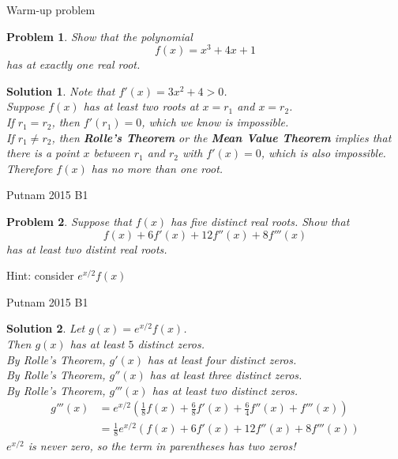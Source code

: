 \documentclass{beamer}
\newtheorem{prob}{Problem}
\newtheorem{soln}{Solution}
\begin{document}
\begin{frame}{Warm-up problem}
\begin{prob}
Show that the polynomial
$$f(x) = x^3 + 4x + 1$$
has at exactly one real root.
\end{prob}
\pause
\begin{soln}
Note that $f'(x) = 3x^2 + 4 > 0$.\\
\pause
Suppose $f(x)$ has at least two roots at $x=r_1$ and $x = r_2$.\\
\pause
If $r_1=r_2$, then $f'(r_1) = 0$, which we know is impossible.\\
\pause
If $r_1\neq r_2$, then \textbf{Rolle's Theorem} or the \textbf{Mean Value Theorem} implies that there is a point $x$ between $r_1$ and $r_2$ with $f'(x) = 0$, which is also impossible.\\
\pause
Therefore $f(x)$ has no more than one root.
\end{soln}
\end{frame}


\begin{frame}{Putnam 2015 B1}
\begin{prob}
Suppose that $f(x)$ has five distinct real roots. 
Show that
$$f(x) + 6f'(x) + 12f''(x) + 8f'''(x)$$
has at least two distint real roots.
\end{prob}
\pause
Hint: consider $e^{x/2}f(x)$
\end{frame}

\begin{frame}{Putnam 2015 B1}
\begin{soln}
Let $g(x) = e^{x/2}f(x)$.\\\pause
Then $g(x)$ has at least $5$ distinct zeros.\\\pause
By Rolle's Theorem, $g'(x)$ has at least four distinct zeros.\\\pause
By Rolle's Theorem, $g''(x)$ has at least three distinct zeros.\\\pause
By Rolle's Theorem, $g'''(x)$ has at least two distinct zeros.\\\pause
\pause
\begin{align*}
g'''(x)
  & = e^{x/2}(\frac{1}{8}f(x) + \frac{6}{8}f'(x) + \frac{6}{4}f''(x) + f'''(x))\\
  & = \frac{1}{8}e^{x/2}(f(x) + 6f'(x) + 12f''(x) + 8f'''(x))
\end{align*}
\pause
$e^{x/2}$ is never zero, so the term in parentheses has two zeros!
\end{soln}
\end{frame}
\end{document}
